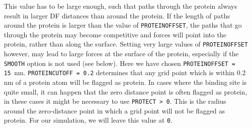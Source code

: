 This value has to be large enough, such that paths through the protein always result in larger DF distances than around the protein. 
If the length of paths around the protein is larger than the value of \texttt{PROTEINOFFSET}, the paths that go through the protein may become competitive and forces will point into the protein, 
rather than along the surface. Setting very large values of \texttt{PROTEINOFFSET} however, may lead to large forces at the surface of the protein, especially if the \texttt{SMOOTH} option is not used (see below).
Here we have chosen \texttt{PROTEINOFFSET = 15}~nm. 
\texttt{PROTEINCUTOFF = 0.2} determines that any grid point which is within 0.2 nm of a protein atom will be flagged as protein. 
In cases where the binding site is quite small, it can happen that the zero distance point is often flagged as protein, in these cases it might be necessary to use \texttt{PROTECT > 0}. 
This is the radius around the zero-distance point in which a grid point will not be flagged as protein. For our simulation, we will leave this value at \texttt{0}. 

